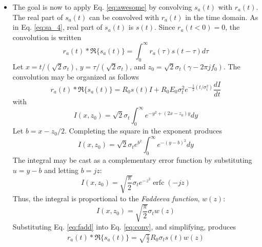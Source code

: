 \documentclass[amsmath,amssymb,aps,prd,10pt,twocolumn,showkeys]{revtex4}
\DeclareMathOperator\erfc{erfc}
\begin{document}
\begin{itemize}
\item The goal is now to apply Eq. \ref{eq:awesome} by convolving $s_a(t)$ with $r_a(t)$.  The real part of $s_a(t)$ can be convolved with $r_a(t)$ in the time domain.  As in Eq. \ref{eq:sa_4}, real part of $s_a(t)$ is $s(t)$.  Since $r_a(t<0)=0$, the convolution is written
\begin{equation}
r_a(t) * \Re\lbrace s_a(t) \rbrace = \int_0^{\infty} r_a(\tau) s(t-\tau) d\tau
\end{equation}
Let $x=t/(\sqrt{2}\sigma_t)$, $y=\tau/(\sqrt{2}\sigma_t)$, and $z_0 = \sqrt{2}\sigma_t(\gamma-2\pi jf_0)$. The convolution may be organized as follows
\begin{equation}
r_a(t) * \Re\lbrace s_a(t) \rbrace = R_0 s(t) I + R_0 E_0 \sigma_t^2 e^{-\frac{1}{2}(t/\sigma_t^2)} \frac{dI}{dt} \label{eq:conv}
\end{equation}
with
\begin{equation}
I(x,z_0) = \sqrt{2}\sigma_t \int_0^{\infty} e^{-y^2 + (2x-z_0)y} dy
\end{equation}
Let $b = x-z_0/2$. Completing the square in the exponent produces
\begin{equation}
I(x,z_0) = \sqrt{2}\sigma_t e^{b^2} \int_0^{\infty} e^{-(y-b)^2} dy
\end{equation}
The integral may be cast as a complementary error function by substituting $u=y-b$ and letting $b=jz$:
\begin{equation}
I(x,z_0) = \sqrt{\frac{\pi}{2}}\sigma_t e^{-z^2}\erfc(-jz)
\end{equation}
Thus, the integral is proportional to the \textit{Faddeeva function}, $w(z)$:
\begin{equation}
I(x,z_0) = \sqrt{\frac{\pi}{2}} \sigma_t w(z) \label{eq:fadd}
\end{equation}
Substituting Eq. \ref{eq:fadd} into Eq. \ref{eq:conv}, and simplifying, produces
\begin{multline}
r_a(t) * \Re\lbrace s_a(t) \rbrace = \sqrt{\frac{\pi}{2}}R_0 \sigma_t s(t) w(z) \\

\end{multline}
\end{itemize}
\end{document}
